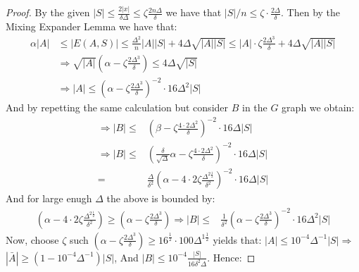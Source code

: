  \begin{proof}
   By the given $|S| \le \frac{2|x|}{\delta\Delta} \le \zeta\frac{2n\Delta}{\delta}$ we have that $|S|/n \le \zeta\cdot \frac{2\Delta}{\delta}$.
   Then by the Mixing Expander Lemma we have that:   
   \begin{equation*}
     \begin{split}
       \alpha |A| & \le |E(A,S)| \le \frac{\Delta^{2}}{n}|A||S| + 4 \Delta \sqrt{|A||S|} \le |A| \cdot \zeta \frac{2\Delta^{3}}{\delta} +  4 \Delta \sqrt{|A||S|}\\ 
       & \Rightarrow \sqrt{|A|}\left(\alpha-\zeta \frac{2\Delta^{3}}{\delta}  \right) \le 4\Delta\sqrt{|S|} \\
       & \Rightarrow |A| \le \left( \alpha -  \zeta \frac{2\Delta^{3}}{\delta}  \right)^{-2} \cdot 16\Delta^{2}|S|
     \end{split}
   \end{equation*}
   And by repetting the same calculation but consider $B$ in the $G$ graph we obtain: 
\begin{equation*}
     \begin{split}
       \Rightarrow  |B| \le & \left( \beta -  \zeta \frac{4 \cdot 2\Delta^{2} }{\delta}  \right)^{-2} \cdot 16\Delta|S|\\
       \Rightarrow  |B| \le & \left( \frac{\delta}{\sqrt{\Delta}}\alpha   -  \zeta \frac{4 \cdot 2\Delta^{2} }{\delta}  \right)^{-2} \cdot 16\Delta|S|\\
       = & \frac{\Delta}{\delta^{2}} \left(  \alpha -  4\cdot 2\zeta \frac{\Delta^{2\frac{1}{2}}}{\delta^{2}}   \right)^{-2} \cdot 16\Delta|S| 
     \end{split}
   \end{equation*}
   And for large enugh $\Delta$ the above is bounded by:
   \begin{equation*}
     \begin{split}
     \left(  \alpha -  4\cdot 2\zeta \frac{\Delta^{2\frac{1}{2}}}{\delta^{2}}   \right) \ge \left( \alpha -  \zeta \frac{2\Delta^{3}}{\delta}  \right) \Rightarrow |B|  \le  & \frac{1}{\delta^{2}} \left( \alpha -  \zeta \frac{2\Delta^{3}}{\delta}  \right)^{-2} \cdot 16\Delta^{2}|S| 
     \end{split}
   \end{equation*}
   Now, choose $\zeta$ such $\left( \alpha -  \zeta \frac{2\Delta^{3}}{\delta}  \right) \ge 16^{\frac{1}{2}} \cdot 100 \Delta^{1\frac{1}{2}}$ yields that: $|A| \le 10^{-4}\Delta^{-1} |S| \Rightarrow $$ |\bar{A}| \ge \left( 1 - 10^{-4} \Delta^{-1}\right)|S|$, And $|B| \le 10^{-4} \frac{|S|}{16 \delta^{2}\Delta}$. Hence:


\end{proof}
